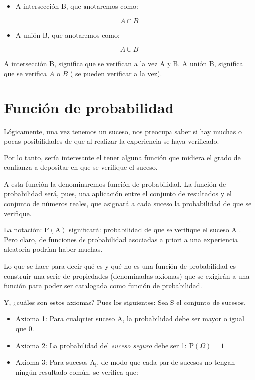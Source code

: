 \documentclass[
  a4paper,
  DIV=11,
  numbers=noendperiod]{scrreprt}
\providecommand{\tightlist}{%
  \setlength{\itemsep}{0pt}\setlength{\parskip}{0pt}}\usepackage{longtable,booktabs,array}
\begin{document}
\begin{itemize}
\tightlist
\item
  A intersección B, que anotaremos como:
\end{itemize}

\[
A \cap B
\]

\begin{itemize}
\tightlist
\item
  A unión B, que anotaremos como:
\end{itemize}

\[
A \cup B
\]

A intersección B, significa que se verifican a la vez A y B. A unión B,
significa que se verifica \(A\) o \(B\) ( se pueden verificar a la vez).

\section{Función de probabilidad}\label{funciuxf3n-de-probabilidad}

Lógicamente, una vez tenemos un suceso, nos preocupa saber si hay muchas
o pocas posibilidades de que al realizar la experiencia se haya
verificado.

Por lo tanto, sería interesante el tener alguna función que midiera el
grado de confianza a depositar en que se verifique el suceso.

A esta función la denominaremos función de probabilidad. La función de
probabilidad será, pues, una aplicación entre el conjunto de resultados
y el conjunto de números reales, que asignará a cada suceso la
probabilidad de que se verifique.

La notación: \(\mathrm{P}(\mathrm{A})\) significará: probabilidad de que
se verifique el suceso A . Pero claro, de funciones de probabilidad
asociadas a priori a una experiencia aleatoria podrían haber muchas.

Lo que se hace para decir qué es y qué no es una función de probabilidad
es construir una serie de propiedades (denominadas axiomas) que se
exigirán a una función para poder ser catalogada como función de
probabilidad.

Y, ¿cuáles son estos axiomas? Pues los siguientes: Sea S el conjunto de
sucesos.

\begin{itemize}
\item
  Axioma 1: Para cualquier suceso A, la probabilidad debe ser mayor o
  igual que 0.
\item
  Axioma 2: La probabilidad del \emph{suceso seguro} debe ser 1:
  \(\mathrm{P}(\Omega)=1\)
\item
  Axioma 3: Para sucesos \(\mathrm{A}_{\mathrm{i}}\), de modo que cada
  par de sucesos no tengan ningún resultado común, se verifica que:
\end{itemize}
\end{document}
